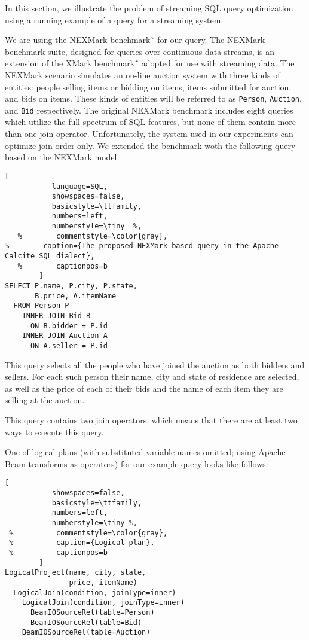 \label {sec:fs-optimization-problem-statement}

In this section, we illustrate the problem of streaming SQL query optimization using a running example of a query for a streaming system.

We are using the NEXMark benchmark˜\cite{tucker2008nexmark} for our query. The NEXMark benchmark suite, designed for queries over continuous data streams, is an extension of the XMark benchmark˜\cite{schmidt2002xmark} adopted for use with streaming data. 
The NEXMark scenario simulates an on-line auction system with three kinds of entities: people selling items or bidding on items, items submitted for auction, and bids on items. 
These kinds of entities will be referred to as \texttt{Person}, \texttt{Auction}, and \texttt{Bid} respectively. 
The original NEXMark benchmark includes eight queries which utilize the full spectrum of SQL features, but none of them contain more than one join operator.  Unfortunately, the system used in our experiments can optimize join order only. 
We extended the benchmark woth  the following query based on the NEXMark model:  



\begin{lstlisting}[
           language=SQL,
           showspaces=false,
           basicstyle=\ttfamily,
           numbers=left,
           numberstyle=\tiny  %,
   %        commentstyle=\color{gray},
%        caption={The proposed NEXMark-based query in the Apache Calcite SQL dialect}, 
   %        captionpos=b
        ]
SELECT P.name, P.city, P.state, 
       B.price, A.itemName 
  FROM Person P 
    INNER JOIN Bid B 
      ON B.bidder = P.id 
    INNER JOIN Auction A 
      ON A.seller = P.id
\end{lstlisting}

This query selects all the people who have joined the auction as both bidders and sellers. 
For each such person their name, city and state of residence are selected, as well as the price of each of their bids and the name of each item they are selling at the auction. 

This query contains two join operators, which means that there are at least two ways to execute this query.

One of  logical   plans (with substituted variable names omitted; using Apache Beam transforms as operators) for our example query looks like  follows: 

\begin{lstlisting}[
           showspaces=false,
           basicstyle=\ttfamily,
           numbers=left,
           numberstyle=\tiny %,
 %          commentstyle=\color{gray},
 %          caption={Logical plan}, 
 %          captionpos=b
        ]
LogicalProject(name, city, state, 
               price, itemName)
  LogicalJoin(condition, joinType=inner) 
    LogicalJoin(condition, joinType=inner)
      BeamIOSourceRel(table=Person)
      BeamIOSourceRel(table=Bid)
    BeamIOSourceRel(table=Auction)
\end{lstlisting}

